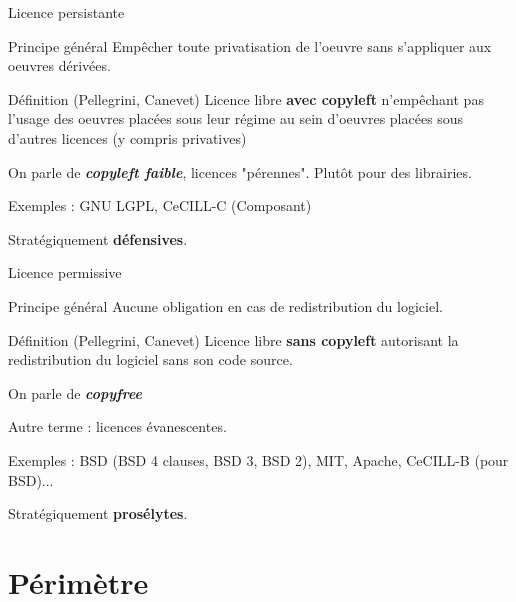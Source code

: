 \documentclass{beamer}
\begin{document}
\begin{frame}{Licence persistante}

\begin{block}{Principe général}
    Empêcher toute privatisation de l'oeuvre sans s'appliquer aux oeuvres dérivées.
  \end{block}

  \begin{alertblock}{Définition (Pellegrini, Canevet)}
    Licence libre \textbf{avec copyleft} n'empêchant pas l'usage des oeuvres placées sous leur régime au sein d'oeuvres placées sous d'autres licences (y compris privatives)
   \end{alertblock}

On parle de \textit{\textbf{copyleft faible}}, licences "pérennes". Plutôt pour des librairies.
 
Exemples : GNU LGPL, CeCILL-C (Composant)

Stratégiquement \textbf{défensives}.

\end{frame}


\begin{frame}{Licence permissive}
  \begin{block}{Principe général}
    Aucune obligation en cas de redistribution du logiciel.
  \end{block}

  \begin{alertblock}{Définition (Pellegrini, Canevet)}
    Licence libre \textbf{sans copyleft} autorisant la redistribution du logiciel sans son code source.
   \end{alertblock}

On parle de \textit{\textbf{copyfree}}

Autre terme : licences évanescentes.

Exemples : BSD (BSD 4 clauses, BSD 3, BSD 2), MIT, Apache, CeCILL-B (pour BSD)... 

Stratégiquement \textbf{prosélytes}.
\end{frame}


\section{Périmètre}
\end{document}
